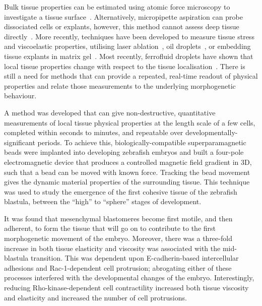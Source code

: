 Bulk tissue properties can be estimated using atomic force microscopy to investigate a tissue surface~\cite{serwaneVivoQuantificationSpatially2017}.
Alternatively, micropipette aspiration can probe dissociated cells or explants, however, this method cannot assess deep tissue directly~\cite{maitreAsymmetricDivisionContractile2016,maitreAdhesionFunctionsCell2012}.
More recently, techniques have been developed to measure tissue stress and viscoelastic properties, utilising laser ablation~\cite{bonnetMechanicalStateMaterial2012}, oil droplets~\cite{serwaneVivoQuantificationSpatially2017}, or embedding tissue explants in matrix gel~\cite{zhouForceProductionMechanical2015}.
Most recently, ferrofluid droplets have shown that local tissue properties change with respect to the tissue localisation~\cite{serwaneVivoQuantificationSpatially2017}. %
There is still a need for methods that can provide a repeated, real-time readout of physical properties and relate those measurements to the underlying morphogenetic behaviour.

A method was developed that can give non-destructive, quantitative measurements of local tissue physical properties at the length scale of a few cells, completed within seconds to minutes, and repeatable over developmentally-significant periods.
To achieve this, biologically-compatible superparamagnetic beads were implanted into developing \gls{zebrafish} embryos and built a four-pole electromagnetic device that produces a controlled magnetic field gradient in 3D, such that a bead can be moved with known force.
Tracking the bead movement gives the dynamic material properties of the surrounding tissue. %
This technique was used to study the emergence of the first cohesive tissue of the \gls{zebrafish} blastula, between the “high” to “sphere” stages of development.

It was found that mesenchymal blastomeres become first motile, and then adherent, to form the tissue that will go on to contribute to the first morphogenetic movement of the embryo.
Moreover, there was a three-fold increase in both tissue elasticity and viscosity was associated with the mid-blastula transition.
This was dependent upon E-cadherin-based intercellular adhesions and Rac-1-dependent cell protrusion; abrogating either of these processes interfered with the developmental changes of the embryo.
Interestingly, reducing Rho-kinase-dependent cell contractility increased both tissue viscosity and elasticity and increased the number of cell protrusions.


